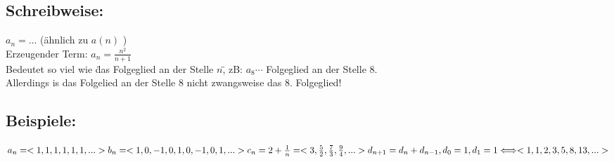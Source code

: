 \documentclass[../mainfile.tex]{subfiles}
\begin{document}
\subsection{Schreibweise:}
$a_n = ...$ (ähnlich zu $a(n)$ )\\
Erzeugender Term: $a_n = \frac{n^2}{n+1}$\\
Bedeutet so viel wie \"das Folgeglied an der Stelle $n$\", zB: $a_8 \cdots$ Folgeglied an der Stelle 8.\\
Allerdings is das Folgelied an der Stelle 8 nicht zwangsweise das 8. Folgeglied!
\subsection*{Beispiele:}
$
a_n = <1, 1, 1, 1, 1, 1, ...>\\
b_n = <1, 0, -1 , 0, 1, 0, -1, 0, 1, ...>\\
c_n = 2+\frac{1}{n}= <3, \frac{5}{2}, \frac{7}{3}, \frac{9}{4}, ...>\\
d_{n+1} = d_n + d_{n-1}, d_0 = 1,  d_1=1  \Longleftrightarrow  <1, 1, 2, 3, 5, 8, 13, ...>
$\\
\end{document}
